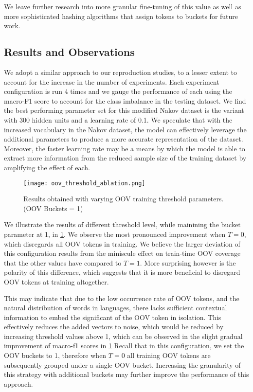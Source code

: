 \documentclass[../../fyp.tex]{subfiles}
\begin{document}
We leave further research into more granular fine-tuning of this value as well as more sophisticated hashing algorithms that assign tokens to buckets for future work. 

\subsection{Results and Observations}

We adopt a similar approach to our reproduction studies, to a lesser extent to account for the increase in the number of experiments. Each experiment configuration is run 4 times and we gauge the performance of each using the macro-F1 score to account for the class imbalance in the testing dataset. We find the best performing parameter set for this modified Nakov dataset is the variant with 300 hidden units and a learning rate of 0.1. We speculate that with the increased vocabulary in the Nakov dataset, the model can effectively leverage the additional parameters to produce a more accurate representation of the dataset. Moreover, the faster learning rate may be a means by which the model is able to extract more information from the reduced sample size of the training dataset by amplifying the effect of each. 

\begin{figure}[!ht]
	\centering
	\texttt{[image: oov\_threshold\_ablation.png]}
	\caption{Results obtained with varying OOV training threshold parameters. (OOV Buckets = 1)}
	\label{fig:oov_threshold_ablation}
\end{figure}

We illustrate the results of different threshold level, while mainining the bucket parameter at 1, in \ref{fig:oov_threshold_ablation}. We observe the most pronounced improvement when $T=0$, which disregards all OOV tokens in training. We believe the larger deviation of this configuration results from the miniscule effect on train-time OOV coverage that the other values have compared to $T=1$. More surprising however is the polarity of this difference, which suggests that it is more beneficial to disregard OOV tokens at training altogether. 

This may indicate that due to the low occurrence rate of OOV tokens, and the natural distribution of words in languages, there lacks sufficient contextual information to embed the significant of the OOV token in isolation. This effectively reduces the added vectors to noise, which would be reduced by increasing threshold values above 1, which can be observed in the slight gradual improvement of macro-f1 scores in \ref{fig:oov_threshold_ablation}  Recall that in this configuration, we set the OOV buckets to 1, therefore when $T=0$ all training OOV tokens are subsequently grouped under a single OOV bucket. Increasing the granularity of this strategy with additional buckets may further improve the performance of this approach.
\end{document}
